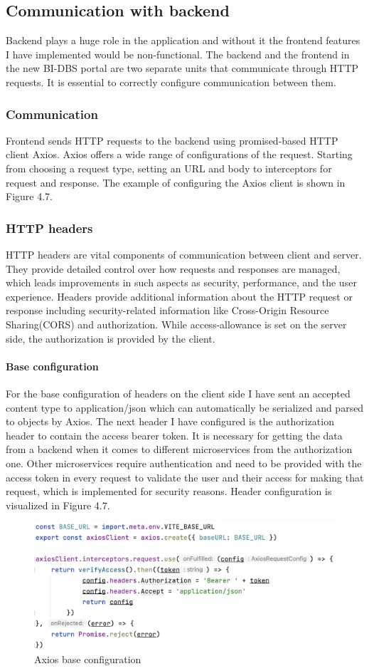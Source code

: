 \subsection{Communication with backend} Backend plays a huge role in the application and without it the frontend features I have implemented  would be non-functional. The backend and the frontend in the new BI-DBS portal are two separate units that communicate through HTTP requests. It is essential to correctly configure communication between them.

\subsubsection{Communication } Frontend sends HTTP requests to the backend using promised-based HTTP client Axios. Axios offers a wide range of configurations of the request. Starting from choosing a request type, setting an URL and body to interceptors for request and response. The example of configuring the Axios client is shown in Figure 4.7.

\subsubsection{HTTP headers} HTTP headers are vital components of communication between client and server. They provide detailed control over how requests and responses are managed, which leads improvements in such aspects as security, performance, and the user experience. Headers provide additional information about the HTTP request or response including security-related information like Cross-Origin Resource Sharing(CORS) and authorization. While access-allowance is set on the server side, the authorization is provided by the client. 

\paragraph*{Base configuration} For the base configuration of headers on the client side I have sent an accepted content type to application/json which can automatically be serialized and parsed to objects by Axios. The next header I have configured is the authorization header to contain the access bearer token. It is necessary for getting the data from a backend when it comes to different microservices from the authorization one. Other microservices require authentication and need to be provided with the access token in every request to validate the user and their access for making that request, which is implemented for security reasons. Header configuration is visualized in Figure 4.7.

\begin{figure}[h]
\centering
\includegraphics[scale=0.53]{../png/headers_base.png}
\caption{Axios base configuration}
\end{figure}


